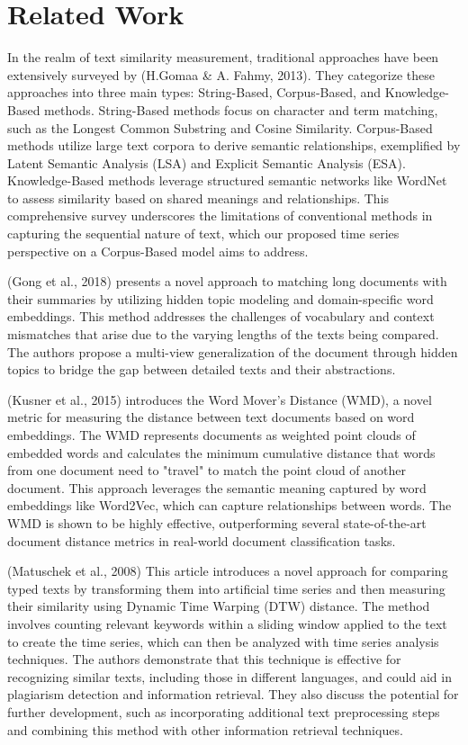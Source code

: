 \documentclass[UTF8]{ctexart}
\begin{document}
 \newpage

\section{Related Work}
 {
  In the realm of text similarity measurement, traditional approaches have been extensively surveyed by (H.Gomaa \& A. Fahmy, 2013)\cite{ref8}. They categorize these approaches into three main types: String-Based, Corpus-Based, and Knowledge-Based methods. String-Based methods focus on character and term matching, such as the Longest Common Substring and Cosine Similarity. Corpus-Based methods utilize large text corpora to derive semantic relationships, exemplified by Latent Semantic Analysis (LSA) and Explicit Semantic Analysis (ESA). Knowledge-Based methods leverage structured semantic networks like WordNet to assess similarity based on shared meanings and relationships. This comprehensive survey underscores the limitations of conventional methods in capturing the sequential nature of text, which our proposed time series perspective on a Corpus-Based model aims to address.

  (Gong et al., 2018)\cite{ref9} presents a novel approach to matching long documents with their summaries by utilizing hidden topic modeling and domain-specific word embeddings. This method addresses the challenges of vocabulary and context mismatches that arise due to the varying lengths of the texts being compared. The authors propose a multi-view generalization of the document through hidden topics to bridge the gap between detailed texts and their abstractions.

  (Kusner et al., 2015)\cite{ref6} introduces the Word Mover's Distance (WMD), a novel metric for measuring the distance between text documents based on word embeddings. The WMD represents documents as weighted point clouds of embedded words and calculates the minimum cumulative distance that words from one document need to "travel" to match the point cloud of another document. This approach leverages the semantic meaning captured by word embeddings like Word2Vec, which can capture relationships between words. The WMD is shown to be highly effective, outperforming several state-of-the-art document distance metrics in real-world document classification tasks.

  (Matuschek et al., 2008)\cite{ref1} This article introduces a novel approach for comparing typed texts by transforming them into artificial time series and then measuring their similarity using Dynamic Time Warping (DTW) distance. The method involves counting relevant keywords within a sliding window applied to the text to create the time series, which can then be analyzed with time series analysis techniques. The authors demonstrate that this technique is effective for recognizing similar texts, including those in different languages, and could aid in plagiarism detection and information retrieval. They also discuss the potential for further development, such as incorporating additional text preprocessing steps and combining this method with other information retrieval techniques.
 }
\newpage
\end{document}
